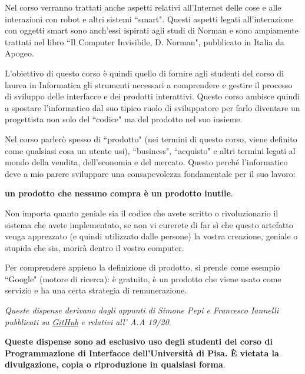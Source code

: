 Nel corso verranno trattati anche aspetti relativi all'Internet delle cose e alle interazioni con robot e altri sistemi ``smart". Questi aspetti
legati all'interazione con oggetti smart sono anch'essi ispirati agli studi di Norman e sono ampiamente trattati nel libro
``Il Computer Invisibile, D. Norman", pubblicato in Italia da Apogeo.

L'obiettivo di questo corso \`e quindi quello di fornire agli studenti del corso di laurea in Informatica gli strumenti necessari a comprendere e
gestire il processo di sviluppo delle interfacce e dei prodotti interattivi. Questo corso ambisce quindi a spostare l'informatico dal suo tipico
ruolo di sviluppatore per farlo diventare un progettista non solo del ``codice" ma del prodotto nel suo insieme.

Nel corso parler\`o spesso di ``prodotto" (nei termini di questo corso, viene definito come qualsiasi cosa un utente usi), ``business",
``acquisto" e altri termini legati al mondo della vendita, dell'economia e del mercato. Questo perch\'e l'informatico deve a mio parere sviluppare
una consapevolezza fondamentale per il suo lavoro:

\vspace{\baselineskip}
\textbf{un prodotto che nessuno compra \`e un prodotto inutile}.
\vspace{\baselineskip}

Non importa quanto geniale sia il codice che avete scritto o rivoluzionario il sistema che avete implementato, se non vi curerete di far s\`i che questo
artefatto venga apprezzato (e quindi utilizzato dalle persone) la vostra creazione, geniale o stupida che sia, morir\`a dentro il vostro computer.

Per comprendere appieno la definizione di prodotto, si prende come esempio ``Google" (motore di ricerca): \`e gratuito, \`e un prodotto che viene
usato come servizio e ha una certa strategia di remunerazione.

\vfill
\textit{Queste dispense derivano dagli appunti di Simone Pepi e Francesco Iannelli pubblicati su \href{https://github.com/unipi-notes/HMI_Notes-2019-20}
{\underline{GitHub}} e relativi all' A.A 19/20}.

\textbf{Queste dispense sono ad esclusivo uso degli studenti del corso di Programmazione di Interfacce dell'Universit\`a di Pisa. \`E
vietata la divulgazione, copia o riproduzione in qualsiasi forma}.
